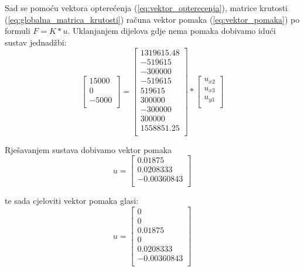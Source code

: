 \documentclass[a4paper,twoside,12pt]{memoir} %
\begin{document}
Sad se pomoću vektora opterećenja (\ref{eq:vektor_opterecenja}), matrice krutosti (\ref{eq:globalna_matrica_krutosti}) računa vektor pomaka (\ref{eq:vektor_pomaka}) po formuli $F = K * u $. Uklanjanjem dijelova gdje nema pomaka dobivamo idući sustav jednadžbi:
\begin{equation}
\label{eq:racunanje_pomaka}
    \begin{bmatrix}
    15000 \\ 0 \\ -5000 \\
    \end{bmatrix}
    =
    \begin{bmatrix}
    1319615.48 \\ -519615 \\ -300000 \\
    -519615 \\ 519615 \\ 300000 \\
    -300000 \\ 300000 \\ 1558851.25 \\
    \end{bmatrix}
    *    
    \begin{bmatrix}
    u_{x2} \\ u_{x3} \\ u_{y3} \\
    \end{bmatrix}
\end{equation}

Rješavanjem sustava dobivamo vektor pomaka
\begin{equation}
\label{eq:vektor_pomaka_kratki}
    u =
    \begin{bmatrix}
    0.01875 \\ 0.0208333 \\ -0.00360843 \\
    \end{bmatrix}
\end{equation}

te sada cjeloviti vektor pomaka glasi:
\begin{equation}
\label{eq:vektor_pomaka_cijeli}
    u =
    \begin{bmatrix}
    0 \\ 0 \\ 0.01875 \\ 0 \\ 0.0208333 \\ -0.00360843 \\
    \end{bmatrix}
\end{equation}
\end{document}
